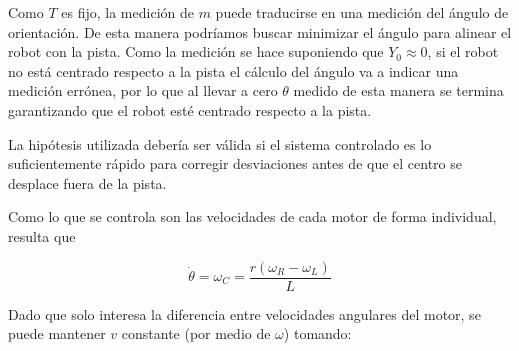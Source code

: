\documentclass[10pt,conference,a4paper,onecolumn]{article}%
\begin{document}
%
%
%
%

Como $T$ es fijo, la medición de $m$ puede traducirse en una medición del ángulo de orientación. De esta manera podríamos buscar minimizar el ángulo para alinear el robot con la pista. Como la medición se hace suponiendo que $Y_0 \approx 0 $, si el robot no está centrado respecto a la pista el cálculo del ángulo va a indicar una medición errónea, por lo que al llevar a cero $ \theta $ medido de esta manera se termina garantizando que el robot esté centrado respecto a la pista.

La hipótesis utilizada debería ser válida si el sistema controlado es lo suficientemente rápido para corregir desviaciones antes de que el centro se desplace fuera de la pista.

Como lo que se controla son las velocidades de cada motor de forma individual, resulta que


\begin{equation}
\dot{\theta}=\omega_C=\frac{r(\omega _R - \omega _L)}{L}
\label{eq:tita_omega}
\end{equation}

Dado que solo  interesa la diferencia entre velocidades angulares del motor, se puede mantener $v$ constante (por medio de $\omega $) tomando:
\end{document}
